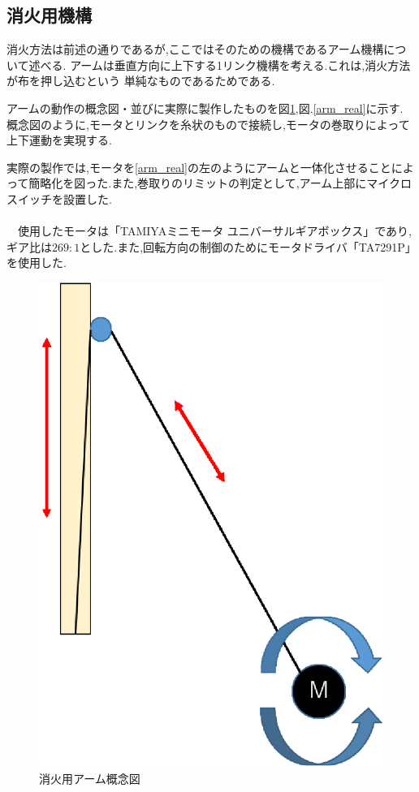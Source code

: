 \subsection{消火用機構}
消火方法は前述の通りであるが,ここではそのための機構であるアーム機構について述べる.
アームは垂直方向に上下する1リンク機構を考える.これは,消火方法が布を押し込むという
単純なものであるためである.

アームの動作の概念図・並びに実際に製作したものを図\ref{arm_con},図.\ref{arm_real}に示す.
概念図のように,モータとリンクを糸状のもので接続し,モータの巻取りによって上下運動を実現する.

実際の製作では,モータを\ref{arm_real}の左のようにアームと一体化させることによって簡略化を図った.また,巻取りのリミットの判定として,アーム上部にマイクロスイッチを設置した.
\\
\\
\ \ 使用したモータは「TAMIYAミニモータ ユニバーサルギアボックス」であり,ギア比は$269:1$とした.また,回転方向の制御のためにモータドライバ「TA7291P」を使用した.

\begin{figure}[h]
 \centering
   \includegraphics[clip,scale=0.4]{../../report_3/kakeru_report_03/picture/arm_img.eps}
   \caption{消火用アーム概念図}
 \label{arm_con}
\end{figure}



